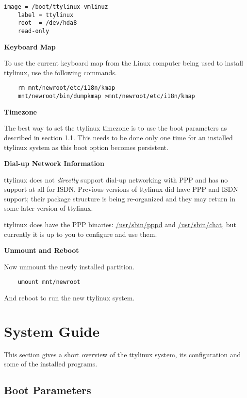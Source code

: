 \documentclass[10pt]{article}
\begin{document}
\begin{lstlisting}
image = /boot/ttylinux-vmlinuz
	label = ttylinux
	root  = /dev/hda8
	read-only
\end{lstlisting}

{\bf Keyboard Map}

To use the current keyboard map from the Linux computer being used to install
ttylinux, use the following commands.

\begin{lstlisting}
	rm mnt/newroot/etc/i18n/kmap
	mnt/newroot/bin/dumpkmap >mnt/newroot/etc/i18n/kmap
\end{lstlisting}

{\bf Timezone}

The best way to set the ttylinux timezone is to use the boot parameters as
described in section \ref{bootparms}. This needs to be done only one time for
an installed ttylinux system as this boot option becomes persistent.

{\bf Dial-up Network Information}

ttylinux does not {\it directly} support dial-up networking with PPP and has no
support at all for ISDN. Previous versions of ttylinux did have PPP and ISDN
support; their package structure is being re-organized and they may return in
some later version of ttylinux.

ttylinux does have the PPP binaries: \url{/usr/sbin/pppd} and
\url{/usr/sbin/chat}, but currently it is up to you to configure and use them.

{\bf Unmount and Reboot}

Now unmount the newly installed partition.

\begin{lstlisting}
	umount mnt/newroot
\end{lstlisting}

And reboot to run the new ttylinux system.

\newpage
\section{System Guide}
\label{sysguide}

This section gives a short overview of the ttylinux system, its configuration
and some of the installed programs.

\subsection{Boot Parameters}
\label{bootparms}
\end{document}
